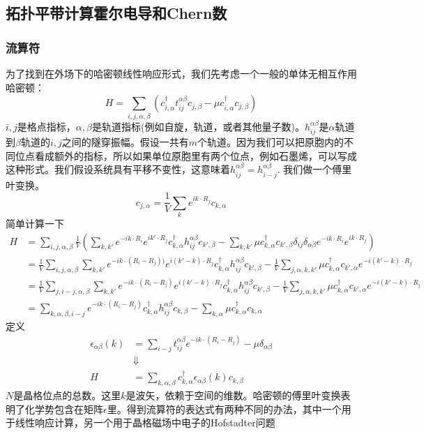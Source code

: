 \documentclass{article}
\numberwithin{equation}{subsection}
\begin{document}
\subsection{拓扑平带计算霍尔电导和Chern数}
\subsubsection{流算符}
为了找到在外场下的哈密顿线性响应形式，我们先考虑一个一般的单体无相互作用哈密顿：
\begin{equation}
    H=\sum_{i,j,\alpha,\beta}(c_{i,\alpha}^\dagger t_{ij}^{\alpha\beta}c_{j,\beta}-\mu c_{i,\alpha}^\dagger c_{j,\beta})
\end{equation}
$i,j$是格点指标，$\alpha,\beta$是轨道指标(例如自旋，轨道，或者其他量子数)。$h_{ij}^{\alpha\beta}$是$\alpha$轨道到$\beta$轨道的$i,j$之间的隧穿振幅。假设一共有$m$个轨道。因为我们可以把原胞内的不同位点看成额外的指标，所以如果单位原胞里有两个位点，例如石墨烯，可以写成这种形式。我们假设系统具有平移不变性，这意味着$h_{ij}^{\alpha\beta}=h_{i-j}^{\alpha\beta}$. 我们做一个傅里叶变换。
\begin{equation}
    c_{j,\alpha}=\frac{1}{V}\sum_k e^{ik\cdot R_j}c_{k,\alpha}
\end{equation}
简单计算一下
\begin{equation}
    \begin{split}
        H&=\sum_{i,j,\alpha,\beta}\frac{1}{V}\left(\sum_{k,k'}e^{-ik\cdot R_i}e^{ik'\cdot R_j}c_{k,\alpha}^\dagger h_{ij}^{\alpha\beta}c_{k',\beta}-\sum_{k,k'}\mu c_{k,\alpha}^\dagger c_{k',\beta}\delta_{ij}\delta_{\alpha\beta}e^{-ik\cdot R_i}e^{ik\cdot R_j}\right)\\
        &=\frac{1}{V}\sum_{i,j,\alpha,\beta}\sum_{k,k'}e^{-ik\cdot(R_i-R_j))}e^{i(k'-k)\cdot R_j}c_{k,\alpha}^\dagger h_{ij}^{\alpha\beta}c_{k',\beta}-\frac{1}{V}\sum_{j,\alpha,k,k'}\mu c_{k,\alpha}^\dagger c_{k',\alpha}e^{-i(k'-k)\cdot R_j}\\
        &=\frac{1}{V}\sum_{j,i-j,\alpha,\beta}\sum_{k,k'}e^{-ik\cdot (R_i-R_j)}e^{i(k'-k)\cdot R_j}c_{k,\alpha}^\dagger h_{ij}^{\alpha\beta}c_{k',\beta}-\frac{1}{V}\sum_{j,\alpha,k,k'}\mu c_{k,\alpha}^\dagger c_{k',\alpha}e^{-i(k'-k)\cdot R_j}\\
        &=\sum_{k,\alpha,\beta,i-j}e^{-ik\cdot (R_i-R_j)}c_{k,\alpha}^\dagger h_{ij}^{\alpha\beta}c_{k,\beta}-\sum_{k,\alpha}\mu c_{k,\alpha}^\dagger c_{k,\alpha}
    \end{split}
\end{equation}
定义
\begin{equation}
    \begin{split}
        \epsilon_{\alpha\beta}(k)&=\sum_{i-j}t_{ij}^{\alpha\beta}e^{-ik\cdot (R_i-R_j)}-\mu\delta_{\alpha\beta}\\
        &\Downarrow\\
        H&=\sum_{k,\alpha,\beta}c_{k,\alpha}^\dagger\epsilon_{\alpha\beta}(k)c_{k,\beta}
    \end{split}
\end{equation}
$N$是晶格位点的总数。这里$k$是波矢，依赖于空间的维数。哈密顿的傅里叶变换表明了化学势包含在矩阵$\epsilon$里。得到流算符的表达式有两种不同的办法，其中一个用于线性响应计算，另一个用于晶格磁场中电子的Hofstadter问题
\end{document}
